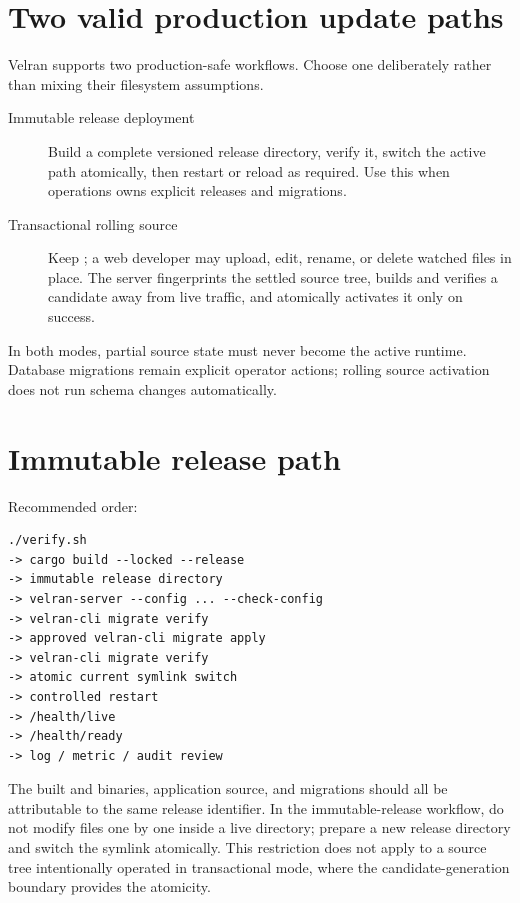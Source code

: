 \section{Two valid production update paths}

Velran supports two production-safe workflows. Choose one deliberately rather than mixing their filesystem assumptions.

\begin{description}
  \item[Immutable release deployment] Build a complete versioned release directory, verify it, switch the active path atomically, then restart or reload as required. Use this when operations owns explicit releases and migrations.
  \item[Transactional rolling source] Keep ; a web developer may upload, edit, rename, or delete watched  files in place. The server fingerprints the settled source tree, builds and verifies a candidate away from live traffic, and atomically activates it only on success.
\end{description}

In both modes, partial source state must never become the active runtime. Database migrations remain explicit operator actions; rolling source activation does not run schema changes automatically.

\section{Immutable release path}

Recommended order:

\begin{lstlisting}
./verify.sh
-> cargo build --locked --release
-> immutable release directory
-> velran-server --config ... --check-config
-> velran-cli migrate verify
-> approved velran-cli migrate apply
-> velran-cli migrate verify
-> atomic current symlink switch
-> controlled restart
-> /health/live
-> /health/ready
-> log / metric / audit review
\end{lstlisting}

The built  and  binaries, application source, and migrations should all be attributable to the same release identifier. In the immutable-release workflow, do not modify files one by one inside a live  directory; prepare a new release directory and switch the symlink atomically. This restriction does not apply to a source tree intentionally operated in transactional  mode, where the candidate-generation boundary provides the atomicity.

